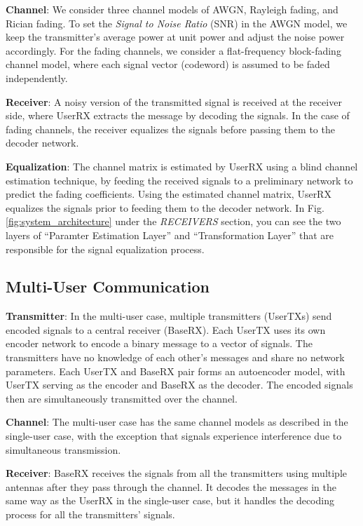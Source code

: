 \textbf{Channel}: We consider three channel models of AWGN, Rayleigh fading, and Rician fading. To set the \textit{Signal to Noise Ratio} (SNR) in the AWGN model, we keep the transmitter's average power at unit power and adjust the noise power accordingly. For the fading channels, we consider a flat-frequency block-fading channel model, where each signal vector (codeword) is assumed to be faded independently.

\textbf{Receiver}: A noisy version of the transmitted signal is received at the receiver side, where UserRX extracts the message by decoding the signals. In the case of fading channels, the receiver equalizes the signals before passing them to the decoder network.

\textbf{Equalization}: The channel matrix is estimated by UserRX using a blind channel estimation technique, by feeding the received signals to a preliminary network to predict the fading coefficients. Using the estimated channel matrix, UserRX equalizes the signals prior to feeding them to the decoder network. In Fig. \ref{fig:system_architecture} under the \textit{RECEIVERS} section, you can see the two layers of ``Paramter Estimation Layer'' and ``Transformation Layer'' that are responsible for the signal equalization process.

\subsection{Multi-User Communication}
\textbf{Transmitter}: In the multi-user case, multiple transmitters (UserTXs) send encoded signals to a central receiver (BaseRX). Each UserTX uses its own encoder network to encode a binary message to a vector of signals. The transmitters have no knowledge of each other's messages and share no network parameters. Each UserTX and BaseRX pair forms an autoencoder model, with UserTX serving as the encoder and BaseRX as the decoder. The encoded signals then are simultaneously transmitted over the channel.

\textbf{Channel}: The multi-user case has the same channel models as described in the single-user case, with the exception that signals experience interference due to simultaneous transmission.

\textbf{Receiver}: BaseRX receives the signals from all the transmitters using multiple antennas after they pass through the channel. It decodes the messages in the same way as the UserRX in the single-user case, but it handles the decoding process for all the transmitters' signals.


